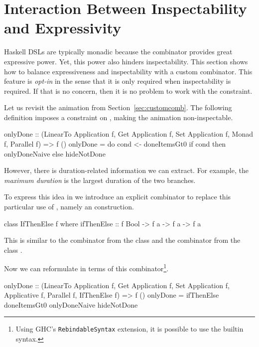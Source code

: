\section{Interaction Between Inspectability and Expressivity}
\label{sec:interaction}

Haskell DSLs are typically monadic because the \hs{>>=} combinator provides
great expressive power. Yet, this power also hinders inspectability. This section shows how to balance 
expressiveness and inspectability with a custom combinator. This feature is \emph{opt-in} in the sense that it is only required when inspectability is required. If that is no concern, then it is no problem to work with the  constraint.

Let us revisit the  animation from Section~\ref{sec:customcomb}. The following definition imposes a  constraint on , making the animation non-inspectable.

\begin{spec}
onlyDone :: (LinearTo Application f, Get Application f,
  Set Application f, Monad f, Parallel f) => f ()
onlyDone = do
  cond <- doneItemsGt0
  if cond then onlyDoneNaive else hideNotDone
\end{spec}

However, there is duration-related information we can extract.
For example, the \emph{maximum duration} is the largest
duration of the two branches.

To express this idea in \dsl{} we introduce an explicit combinator to replace
this particular use of \hs{>>=}, namely an  construction. 

\begin{code}
class IfThenElse f where
  ifThenElse :: f Bool -> f a -> f a -> f a
\end{code}

This is similar to the  combinator from the  class
\cite{DBLP:phd/ethos/Yallop10} and the  combinator from the
 class \cite{Mokhov:2019:SAF:3352468.3341694}.

Now we can reformulate  in terms of this  combinator\footnote{Using GHC's \texttt{RebindableSyntax} extension, it is possible to use the builtin  syntax.}.

\begin{code}
onlyDone :: (LinearTo Application f, Get Application f,
  Set Application f, Applicative f, Parallel f, IfThenElse f)
  => f ()
onlyDone = ifThenElse doneItemsGt0 onlyDoneNaive hideNotDone
\end{code}

